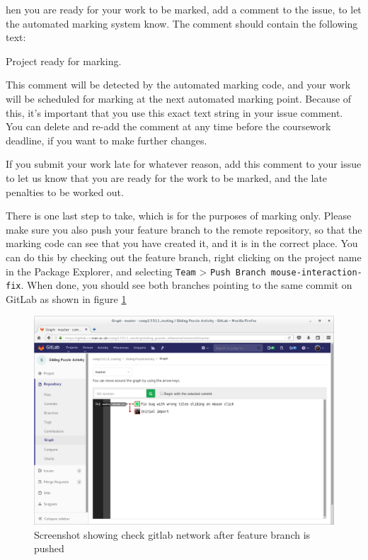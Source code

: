 \documentclass[
]{book}
\newenvironment{Shaded}{\begin{snugshade}}{\end{snugshade}}
\newcommand{\NormalTok}[1]{#1}
\begin{document}
hen you are ready for your work to be marked, add a comment to the issue, to let the automated marking system know. The comment should contain the following text:

\begin{Shaded}
\begin{Highlighting}[]
\NormalTok{Project ready for marking.}
\end{Highlighting}
\end{Shaded}

This comment will be detected by the automated marking code, and your work will be scheduled for marking at the next automated marking point. Because of this, it's important that you use this exact text string in your issue comment. You can delete and re-add the comment at any time before the coursework deadline, if you want to make further changes.

If you submit your work late for whatever reason, add this comment to your issue to let us know that you are ready for the work to be marked, and the late penalties to be worked out.

There is one last step to take, which is for the purposes of marking only. Please make sure you also push your feature branch to the remote repository, so that the marking code can see that you have created it, and it is in the correct place. You can do this by checking out the feature branch, right clicking on the project name in the Package Explorer, and selecting \texttt{Team} \textgreater{} \texttt{Push\ Branch\ \textquotesingle{}mouse-interaction-fix\textquotesingle{}}. When done, you should see both branches pointing to the same commit on GitLab as shown in figure \ref{fig:checkGitLabNetworkAfterFeatureBranchIsPushed-fig}

\begin{figure}

{\centering \includegraphics[width=1\linewidth]{images/checkGitLabNetworkAfterFeatureBranchIsPushed} 

}

\caption{Screenshot showing check gitlab network after feature branch is pushed}\label{fig:checkGitLabNetworkAfterFeatureBranchIsPushed-fig}
\end{figure}
\end{document}

